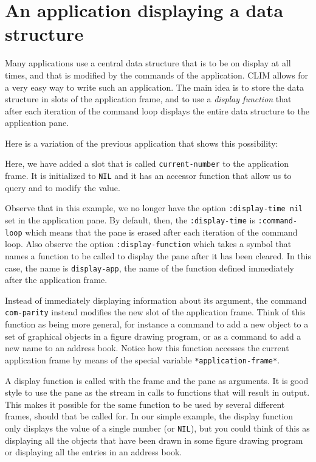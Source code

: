 \section{An application displaying a data structure}

Many applications use a central data structure that is to be on display
at all times, and that is modified by the commands of the application.
CLIM allows for a very easy way to write such an application.  The main
idea is to store the data structure in slots of the application frame,
and to use a \emph{display function}
that after each iteration of the command loop displays the entire data
structure to the application pane.

Here is a variation of the previous application that shows this
possibility:



Here, we have added a slot that is called \texttt{current-number} to the
application frame.  It is initialized to \texttt{NIL} and it has an accessor
function that allow us to query and to modify the value.

Observe that in this example, we no longer have the option
\texttt{:display-time nil} set in the application pane.  By default, then,
the \texttt{:display-time} is \texttt{:command-loop} which means that the pane is
erased after each iteration of the command loop.  Also observe the
option \texttt{:display-function} which takes a symbol that names a function
to be called to display the pane after it has been cleared.  In this
case, the name is \texttt{display-app}, the name of the function defined
immediately after the application frame.

Instead of immediately displaying information about its argument, the
command \texttt{com-parity} instead modifies the new slot of the application
frame.  Think of this function as being more general, for instance a
command to add a new object to a set of graphical objects in a figure
drawing program, or as a command to add a new name to an address book.
Notice how this function accesses the current application frame by means
of the special variable \texttt{*application-frame*}.

A display function is called with the frame and the pane as arguments.
It is good style to use the pane as the stream in calls to functions
that will result in output.  This makes it possible for the same
function to be used by several different frames, should that be called
for.  In our simple example, the display function only displays the
value of a single number (or \texttt{NIL}), but you could think of this as
displaying all the objects that have been drawn in some figure drawing
program or displaying all the entries in an address book.

